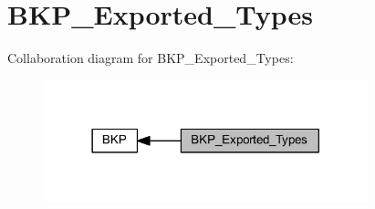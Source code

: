 \hypertarget{group___b_k_p___exported___types}{}\section{B\+K\+P\+\_\+\+Exported\+\_\+\+Types}
\label{group___b_k_p___exported___types}
Collaboration diagram for B\+K\+P\+\_\+\+Exported\+\_\+\+Types\+:
\nopagebreak
\begin{figure}[H]
\begin{center}
\leavevmode
\includegraphics[width=266pt]{group___b_k_p___exported___types}
\end{center}
\end{figure}
